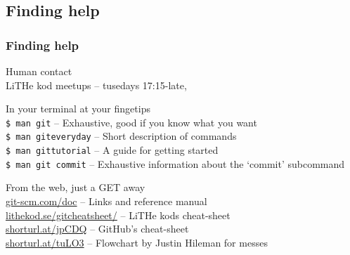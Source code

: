 \documentclass{beamer}
\begin{document}
\subsection{Finding help}

\begin{frame}[fragile]
  \frametitle{Finding help}

  Human contact \\
  \hspace{1em} LiTHe kod meetups -- tusedays 17:15-late,  \\
  \vspace{1em}

  In your terminal at your fingetips \\
  \hspace{1em} \texttt{\$ man git} -- Exhaustive, good if you know what you want \\
  \hspace{1em} \texttt{\$ man giteveryday} -- Short description of commands \\
  \hspace{1em} \texttt{\$ man gittutorial} -- A guide for getting started \\
  \hspace{1em} \texttt{\$ man git commit} -- Exhaustive information about the `commit' subcommand\\
  \vspace{1em}

  From the web, just a GET away \\
  \hspace{1em} \url{git-scm.com/doc} -- Links and reference manual \\
  \hspace{1em} \url{lithekod.se/gitcheatsheet/} -- LiTHe kods cheat-sheet \\
  \hspace{1em} \url{shorturl.at/jpCDQ} -- GitHub's cheat-sheet \\
  \hspace{1em} \url{shorturl.at/tuLO3} -- Flowchart by Justin Hileman for messes\\

\end{frame}
\end{document}
